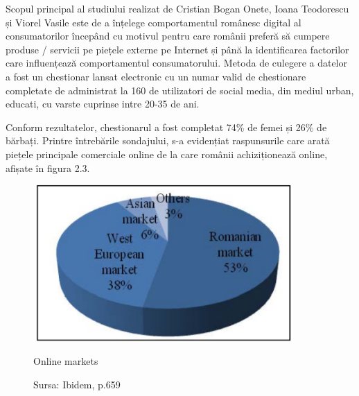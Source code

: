 \documentclass[a4paper, 12pt]{article}
\begin{document}
		\quad Scopul principal al studiului realizat de Cristian Bogan Onete, Ioana Teodorescu și Viorel Vasile este de a înțelege comportamentul românesc digital al consumatorilor începând cu motivul pentru care românii preferă să cumpere produse / servicii pe piețele externe pe Internet și până la identificarea factorilor care influențează comportamentul consumatorului. Metoda de culegere a datelor a fost un chestionar lansat electronic	cu un numar valid de chestionare completate de  administrat la 160 de utilizatori de social media, din mediul urban, educati, cu varste cuprinse intre 20-35 de ani.
		
		\quad Conform rezultatelor, chestionarul a fost completat 74\% de femei și 26\% de bărbați. Printre întrebările sondajului, s-a evidențiat raspunsurile care arată piețele principale comerciale online de la care românii achiziționează online, afișate în figura 2.3. 
		\begin{figure}[!htb]
			\centering
			\includegraphics[width=10cm, height=6cm]{"figures/sixth.png"}
			\caption{Online markets}\label{fig:sixth}
			\caption*{Sursa: Ibidem, p.659}
		\end{figure}
	
\end{document}
